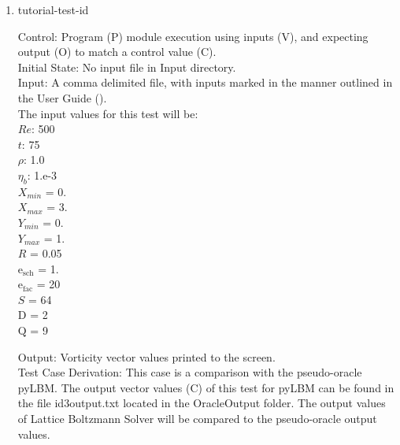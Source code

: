 \documentclass[12pt, titlepage]{article}
\newcommand{\famname}{Lattice Boltzmann Solver}
\newcounter{testcounter} %
\begin{document}
\begin{enumerate}

\item{tutorial-test-id\thetestcounter \\}

Control: Program (P) module execution using inputs (V), and expecting output (O)
to match a control value (C).\\
					
Initial State: No input file in Input directory. \\
					
Input: A comma delimited file, with inputs marked in the manner outlined in the
User Guide (\citet{LBM_UserGuide_PM}).\\The input values for this test will
be:\\
$Re$: 500\\
$t$: 75\\
$\rho$: 1.0\\
$\eta_b$: 1.e-3\\
$X_{min}$ = 0.\\
$X_{max}$ = 3.\\
$Y_{min}$ = 0.\\
$Y_{max}$ = 1.\\
$R$ = 0.05\\
$\mathrm{e_{sch}}$ = 1.\\
$\mathrm{e_{fac}}$ = 20\\
$S$ = 64\\
$\mathrm{D}$ = 2\\
$\mathrm{Q}$ = 9\\


Output: Vorticity vector values printed to the screen. \\

Test Case Derivation: This case is a comparison with the pseudo-oracle
pyLBM. The output vector values (C) of this test for pyLBM can be found in the
file id3output.txt located in the OracleOutput folder. The output values of {\famname} will be compared to the pseudo-oracle output values. %


\end{enumerate}
\end{document}
